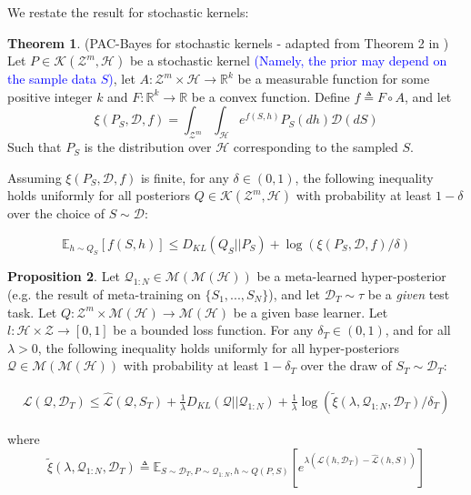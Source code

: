 \documentclass{article}
\theoremstyle{definition}
\newtheorem{theorem}{Theorem}[section]
\newtheorem{proposition}[theorem]{Proposition}
\newcommand{\Expect}[2]{\mathbb{E}_{#1}\left [#2 \right ]}
\newcommand{\LFe}[1]{\textcolor{blue}{#1}}
\begin{document}
We restate the result for stochastic kernels:

\begin{theorem} (PAC-Bayes for stochastic kernels - adapted from Theorem 2 in \citet{Rivasplata2020}) \label{thm:rivasplata-pb-appendix}
	Let $P\in \mathcal{K}(\mathcal{Z}^m, \mathcal{H})$ be a stochastic kernel \LFe{(Namely, the prior may depend on the sample data $S$)}, let $A: \mathcal{Z}^m\times \mathcal{H}\rightarrow \mathbb{R}^k$ be a measurable function for some positive integer $k$ and $F:\mathbb{R}^k\rightarrow \mathbb{R}$ be a convex function.
	Define $f\triangleq F\circ A$, and let 
	$$\xi(P_S, \mathcal{D}, f)=\int_{\mathcal{Z}^m}\int_{\mathcal{H}}e^{f(S, h)}P_S(dh)\mathcal{D}(dS)$$
	Such that $P_S$ is the distribution over $\mathcal{H}$ corresponding to the sampled $S$.
	
	Assuming $\xi(P_S, \mathcal{D}, f)$ is finite, for any $\delta \in (0,1)$, the following inequality holds uniformly for all posteriors $Q\in \mathcal{K}(\mathcal{Z}^m, \mathcal{H})$ with probability at least $1-\delta$ over the choice of $S\sim \mathcal{D}$:
	
	\begin{equation} \label{eq:ribasplata-pb-appendix}
	\Expect{h\sim Q_S}{f(S, h)} \leq D_{KL}(Q_S||P_S)+\log\left (\xi(P_S, \mathcal{D}, f)/\delta\right )
	\end{equation}
\end{theorem}

\begin{proposition}
	Let $\mathcal{Q}_{1:N}\in \mathcal{M}(\mathcal{M}(\mathcal{H}))$ be a meta-learned hyper-posterior (e.g. the result of meta-training on $\{S_1,...,S_N\}$), and let $\mathcal{D}_T\sim \tau$ be a \emph{given} test task. Let $Q: \mathcal{Z}^m\times\mathcal{M}(\mathcal{H})\rightarrow \mathcal{M}(\mathcal{H})$ be a given base learner. Let $l: \mathcal{H}\times \mathcal{Z}\rightarrow [0, 1]$ be a bounded loss function.
	For any $\delta_T \in (0,1)$, and for all $\lambda>0$, the following inequality holds uniformly for all hyper-posteriors $\mathcal{Q}\in \mathcal{M}(\mathcal{M}(\mathcal{H}))$ with probability at least $1-\delta_T$ over the draw of $S_T\sim \mathcal{D}_T$:
	
	\begin{align}
	\mathcal{L}(\mathcal{Q}, \mathcal{D}_T) \leq \hat{\mathcal{L}}(\mathcal{Q}, S_T) + \frac{1}{\lambda}D_{KL}(\mathcal{Q}||\mathcal{Q}_{1:N})
	+\frac{1}{\lambda}\log\left (\tilde{\xi}(\lambda,\mathcal{Q}_{1:N},\mathcal{D}_T)/\delta_T\right )
	\end{align}
	
	
	where 
	\begin{equation}\label{eq:tilde_xi}
	\tilde{\xi}(\lambda,\mathcal{Q}_{1:N},\mathcal{D}_T)\triangleq \Expect{S\sim \mathcal{D}_T, P\sim \mathcal{Q}_{1:N}, h\sim Q(P,S)}{e^{\lambda\left (\mathcal{L}(h, \mathcal{D}_T)-\hat{\mathcal{L}}(h, S)\right )}}
	\end{equation}
\end{proposition}
\end{document}
